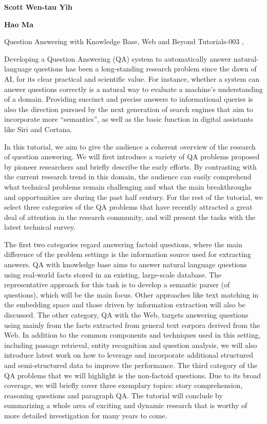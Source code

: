 \begin{bio}
{\bfseries Scott Wen-tau Yih} 

{\bfseries Hao Ma} 
\end{bio}

\begin{tutorial}
  {Question Answering with Knowledge Base, Web and Beyond}
  {Tutorials-003}
  {\daydateyear, \tutorialmorningtime}
  {\TutLocC}

Developing a Question Answering (QA) system to automatically answer natural-language questions has been a long-standing research problem since the dawn of AI, for its clear practical and scientific value. For instance, whether a system can answer questions correctly is a natural way to evaluate a machine’s understanding of a domain. Providing succinct and precise answers to informational queries is also the direction pursued by the next generation of search engines that aim to incorporate more “semantics”, as well as the basic function in digital assistants like Siri and Cortana.

In this tutorial, we aim to give the audience a coherent overview of the research of question answering. We will first introduce a variety of QA problems proposed by pioneer researchers and briefly describe the early efforts. By contrasting with the current research trend in this domain, the audience can easily comprehend what technical problems remain challenging and what the main breakthroughs and opportunities are during the past half century. For the rest of the tutorial, we select three categories of the QA problems that have recently attracted a great deal of attention in the research community, and will present the tasks with the latest technical survey.

The first two categories regard answering factoid questions, where the main difference of the problem settings is the information source used for extracting answers. QA with knowledge base aims to answer natural language questions using real-world facts stored in an existing, large-scale database. The representative approach for this task is to develop a semantic parser (of questions), which will be the main focus. Other approaches like text matching in the embedding space and those driven by information extraction will also be discussed. The other category, QA with the Web, targets answering questions using mainly from the facts extracted from general text corpora derived from the Web. In addition to the common components and techniques used in this setting, including passage retrieval, entity recognition and question analysis, we will also introduce latest work on how to leverage and incorporate additional structured and semi-structured data to improve the performance. The third category of the QA problems that we will highlight is the non-factoid questions. Due to its broad coverage, we will briefly cover three exemplary topics: story comprehension, reasoning questions and paragraph QA. The tutorial will conclude by summarizing a whole area of exciting and dynamic research that is worthy of more detailed investigation for many years to come.

\end{tutorial}
